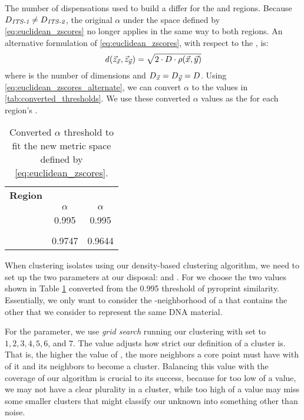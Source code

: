 The number of dispensations \numdims{} used to build a \pyro{} differ for the \Ssixt{} and \Sfive{} regions.
Because  $D{}_{\textit{\textit{ITS}{}-1}{}} \neq D{}_{\textit{\textit{ITS}{}-2}{}}$, the original $\alpha$ under the space defined by \eqref{eq:euclidean_zscores} no longer applies in the same way to both regions.
An alternative formulation of \eqref{eq:euclidean_zscores}, with respect to the \pearson{} \pcfunclabel{}, is:
\begin{equation}\label{eq:euclidean_zscores_alternate}
 \mathit{d}{}(\vec{z}_{\vec{x}}, \vec{z}_{\vec{y}}) = \sqrt{ 2\cdot D{}\cdot\rho{}(\vec{x}, \vec{y}) } 
\end{equation}
where \numdims{} is the number of dimensions and $D{}_{\vec{x}{}} = D{}_{\vec{y}{}} = D{}$. 
Using \autoref{eq:euclidean_zscores_alternate}, we can convert $\alpha$ to the values in \autoref{tab:converted_thresholds}. 
We use these converted $\alpha$ values as the \eps{} for each \itsshort{} region's .
\begin{table}
\centering
\caption{Converted $\alpha$ threshold to fit the new metric space defined by \eqref{eq:euclidean_zscores}.}
\label{tab:converted_thresholds}
\begin{tabular}{|c|c|c|}
\hline
\textbf{\itsshort{} Region} & \Ssixt{}     & \Sfive{}     \\
                            & $\alpha$     & $\alpha$     \\ \hline
\pcfunc{\pca}{\pcb}         & 0.995        & 0.995        \\ \hline
\numdims{}                  & \Ssixtdims{} & \Sfivedims{} \\ \hline
\euczfunc{\pca{}}{\pcb{}}   & 0.9747       & 0.9644       \\ \hline
\end{tabular}
\end{table}

When clustering \cplop{} isolates using our density-based clustering algorithm, we need to set up the two parameters at our disposal: \minneigh{} and \eps{}.
For \eps{} we choose the two values shown in Table \ref{tab:converted_thresholds} converted from the 0.995 \pearson{} threshold of pyroprint similarity. 
Essentially, we only want to consider the \eps{}-neighborhood of a \pyro{} that contains the other \pyros{} that we consider to represent the same DNA material.

For the \minneigh{} parameter, we use \textit{grid search} running our clustering with \minneigh{} set to $1, 2, 3, 4, 5, 6$, and $7$.
The \minneigh{} value adjusts how strict our definition of a cluster is.
That is, the higher the value of \minneigh{}, the more neighbors a core point must have with \eps{} of it and its neighbors to become a cluster.
Balancing this value with the coverage of our algorithm is crucial to its success, because for too low of a value, we may not have a clear plurality in a cluster, while too high of a value may miss some smaller clusters that might classify our unknown \isol{} into something other than noise.